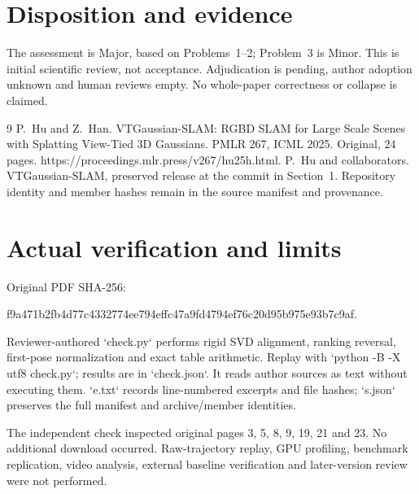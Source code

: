 \documentclass[10pt]{article}
\begin{document}
\section*{Disposition and evidence}
The assessment is Major, based on Problems 1–2; Problem 3 is Minor. This is initial scientific review, not acceptance. Adjudication is pending, author adoption unknown and human reviews empty. No whole-paper correctness or collapse is claimed.\par
9 P. Hu and Z. Han. VTGaussian-SLAM: RGBD SLAM for Large Scale Scenes with Splatting View-Tied 3D Gaussians. PMLR 267, ICML 2025. Original, 24 pages. https://proceedings.mlr.press/v267/hu25h.html. P. Hu and collaborators. VTGaussian-SLAM, preserved release at the commit in Section 1. Repository identity and member hashes remain in the source manifest and provenance.\par
\section*{Actual verification and limits}
Original PDF SHA-256:\par
f9a471b2fb4d77c4332774ee794effc47a9fd4794ef76c20d95b975e93b7c9af.\par
Reviewer-authored `check.py` performs rigid SVD alignment, ranking reversal, first-pose normalization and exact table arithmetic. Replay with `python -B -X utf8 check.py`; results are in `check.json`. It reads author sources as text without executing them. `e.txt` records line-numbered excerpts and file hashes; `s.json` preserves the full manifest and archive/member identities.\par
The independent check inspected original pages 3, 5, 8, 9, 19, 21 and 23. No additional download occurred. Raw-trajectory replay, GPU profiling, benchmark replication, video analysis, external baseline verification and later-version review were not performed.\par
\end{document}
